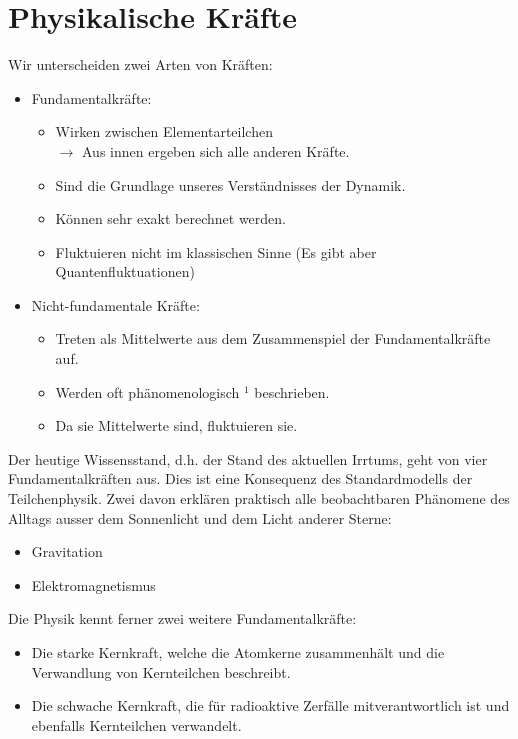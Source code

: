 \section*{Physikalische Kräfte}
Wir unterscheiden zwei Arten von Kräften:

\begin{itemize}
  \item Fundamentalkräfte:
  \begin{itemize}
      \item Wirken zwischen Elementarteilchen\\
      $\rightarrow$ Aus innen ergeben sich alle anderen Kräfte.
      \item Sind die Grundlage unseres Verständnisses der Dynamik.
      \item Können sehr exakt berechnet werden.
      \item Fluktuieren nicht im klassischen Sinne (Es gibt aber Quantenfluktuationen)
  \end{itemize}
  \item Nicht-fundamentale Kräfte:
  \begin{itemize}
      \item Treten als Mittelwerte aus dem Zusammenspiel der Fundamentalkräfte auf.
      \item Werden oft phänomenologisch ${ }^{1}$ beschrieben.
      \item Da sie Mittelwerte sind, fluktuieren sie.
  \end{itemize}
\end{itemize}

Der heutige Wissensstand, d.h. der Stand des aktuellen Irrtums, geht von vier Fundamentalkräften aus. Dies ist eine Konsequenz des Standardmodells der Teilchenphysik. Zwei davon erklären praktisch alle beobachtbaren Phänomene des Alltags ausser dem Sonnenlicht und dem Licht anderer Sterne:

\begin{itemize}
  \item Gravitation
  \item Elektromagnetismus
\end{itemize}

Die Physik kennt ferner zwei weitere Fundamentalkräfte:
\begin{itemize}
    \item Die starke Kernkraft, welche die Atomkerne zusammenhält und die Verwandlung von Kernteilchen beschreibt.
    \item Die schwache Kernkraft, die für radioaktive Zerfälle mitverantwortlich ist und ebenfalls Kernteilchen verwandelt.
\end{itemize}

